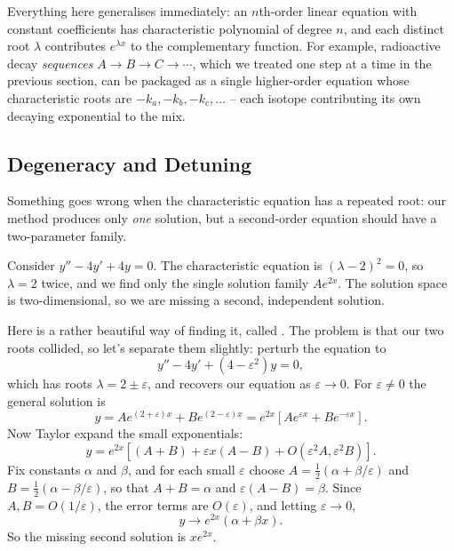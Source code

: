 \begin{remark}
	Everything here generalises immediately: an $n$th-order linear equation with constant coefficients has characteristic polynomial of degree $n$, and each distinct root $\lambda$ contributes $e^{\lambda x}$ to the complementary function. For example, radioactive decay \emph{sequences} $A \to B \to C \to \cdots$, which we treated one step at a time in the previous section, can be packaged as a single higher-order equation whose characteristic roots are $-k_a, -k_b, -k_c, \dots$ -- each isotope contributing its own decaying exponential to the mix.
\end{remark}

\subsection{Degeneracy and Detuning}

Something goes wrong when the characteristic equation has a repeated root: our method produces only \emph{one} solution, but a second-order equation should have a two-parameter family.

\begin{example}
	Consider $y'' - 4y' + 4y = 0$. The characteristic equation is $(\lambda - 2)^2 = 0$, so $\lambda = 2$ twice, and we find only the single solution family $Ae^{2x}$. The solution space is two-dimensional, so we are missing a second, independent solution.

	Here is a rather beautiful way of finding it, called . The problem is that our two roots collided, so let's separate them slightly: perturb the equation to
	$$
	y'' - 4y' + (4 - \varepsilon^2) y = 0,
	$$
	which has roots $\lambda = 2 \pm \varepsilon$, and recovers our equation as $\varepsilon \to 0$. For $\varepsilon \neq 0$ the general solution is
	$$
	y = A e^{(2 + \varepsilon)x} + B e^{(2 - \varepsilon)x} = e^{2x}\left[A e^{\varepsilon x} + B e^{-\varepsilon x}\right].
	$$
	Now Taylor expand the small exponentials:
	$$
	y = e^{2x}\left[(A + B) + \varepsilon x (A - B) + O(\varepsilon^2 A, \varepsilon^2 B)\right].
	$$
	Fix constants $\alpha$ and $\beta$, and for each small $\varepsilon$ choose $A = \frac{1}{2}(\alpha + \beta/\varepsilon)$ and $B = \frac{1}{2}(\alpha - \beta/\varepsilon)$, so that $A + B = \alpha$ and $\varepsilon(A - B) = \beta$. Since $A, B = O(1/\varepsilon)$, the error terms are $O(\varepsilon)$, and letting $\varepsilon \to 0$,
	$$
	y \to e^{2x} (\alpha + \beta x).
	$$
	So the missing second solution is $x e^{2x}$.
\end{example}

